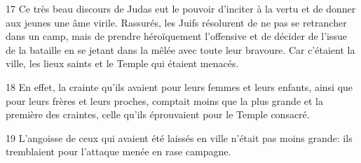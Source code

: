 
17 Ce très beau discours de Judas eut le pouvoir d’inciter à la vertu et de donner aux jeunes une âme virile. Rassurés, les Juifs résolurent de ne pas se retrancher dans un camp, mais de prendre héroïquement l’offensive et de décider de l’issue de la bataille en se jetant dans la mêlée avec toute leur bravoure. Car c’étaient la ville, les lieux saints et le Temple qui étaient menacés.

18 En effet, la crainte qu’ils avaient pour leurs femmes et leurs enfants, ainsi que pour leurs frères et leurs proches, comptait moins que la plus grande et la première des craintes, celle qu’ils éprouvaient pour le Temple consacré.

19 L’angoisse de ceux qui avaient été laissés en ville n’était pas moins grande: ils tremblaient pour l’attaque menée en rase campagne.